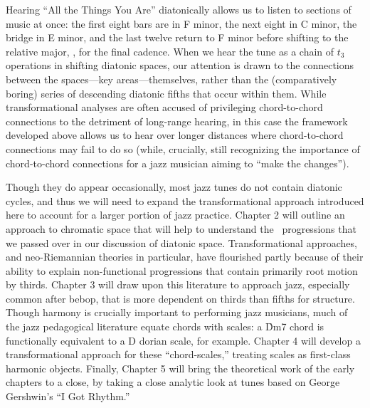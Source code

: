 \documentclass[diss]{subfiles}
\begin{document}
Hearing “All the Things You Are” diatonically allows us to listen to sections
of music at once: the first eight bars are in F minor, the next eight in C
minor, the bridge in E minor, and the last twelve return to F minor before
shifting to the relative major, \Aflat, for the final cadence. When we hear
the tune as a chain of $t_3$ operations in shifting diatonic spaces, our
attention is drawn to the connections between the spaces---key
areas---themselves, rather than the (comparatively boring) series of
descending diatonic fifths that occur within them.  While transformational
analyses are often accused of privileging chord-to-chord connections to the
detriment of long-range hearing, in this case the \gis{} framework developed
above allows us to hear over longer distances where chord-to-chord connections
may fail to do so (while, crucially, still recognizing the importance of
chord-to-chord connections for a jazz musician aiming to “make the changes”).


Though they do appear occasionally, most jazz tunes do not contain diatonic
cycles, and thus we will need to expand the transformational approach
introduced here to account for a larger portion of jazz practice. Chapter 2
will outline an approach to chromatic space that will help to understand the
\tfo\ progressions that we passed over in our discussion of diatonic space.
Transformational approaches, and neo-Riemannian theories in particular, have
flourished partly because of their ability to explain non-functional
progressions that contain primarily root motion by thirds. Chapter 3 will
draw upon this literature to approach jazz, especially common after
bebop, that is more dependent on thirds than fifths for structure. Though
harmony is crucially important to performing jazz musicians, much of the jazz
pedagogical literature equate chords with scales: a \h{Dm7} chord is
functionally equivalent to a D dorian scale, for example. Chapter 4 will
develop a transformational approach for these “chord-scales,” treating scales
as first-class harmonic objects. Finally, Chapter 5 will bring the theoretical
work of the early chapters to a close, by taking a close analytic look at
tunes based on George Gershwin’s “I Got Rhythm.”


\end{document}
